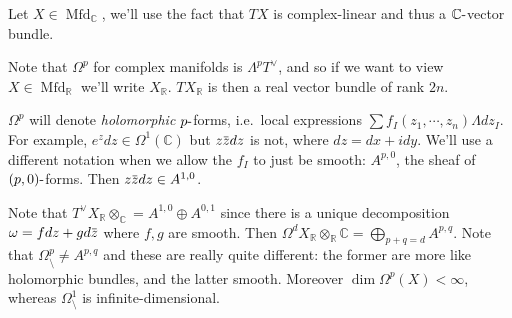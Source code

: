 Let \(X \in {\operatorname{Mfd}}_{\mathbb{C}}\), we'll use the fact that
\(TX\) is complex-linear and thus a \({\mathbb{C}}{\hbox{-}}\)vector
bundle.

\begin{figure}
\centering
{}
\end{figure}

\begin{remark}[Subtlety 1]

Note that \(\Omega^p\) for complex manifolds is \(\Lambda^p T^\vee\),
and so if we want to view \(X \in {\operatorname{Mfd}}_{\mathbb{R}}\)
we'll write \(X_{{\mathbb{R}}}\). \(TX_{\mathbb{R}}\) is then a real
vector bundle of rank \(2n\).

\end{remark}

\begin{remark}[Subtlety 2]

\(\Omega^p\) will denote \emph{holomorphic} \(p{\hbox{-}}\)forms,
i.e.~local expressions \(\sum f_I(z_1, \cdots, z_n) \Lambda dz_I\). For
example, \(e^zdz\in \Omega^1({\mathbb{C}})\) but
\(z\mkern 1.5mu\overline{\mkern-1.5muz\mkern-1.5mu}\mkern 1.5mu dz\) is
not, where \(dz = dx + idy\). We'll use a different notation when we
allow the \(f_I\) to just be smooth: \(A^{p, 0}\), the sheaf of
\((p, 0){\hbox{-}}\)forms. Then
\(z\mkern 1.5mu\overline{\mkern-1.5muz\mkern-1.5mu}\mkern 1.5mu dz\in A^{1, 0}\).

\end{remark}

\begin{remark}

Note that
\(T^\vee X_{\mathbb{R}}\otimes _{\mathbb{C}}= A^{1, 0} \oplus A^{0, 1}\)
since there is a unique decomposition
\(\omega = fdz + gd\mkern 1.5mu\overline{\mkern-1.5muz\mkern-1.5mu}\mkern 1.5mu\)
where \(f,g\) are smooth. Then
\(\Omega^d X_{\mathbb{R}}\otimes_{\mathbb{R}}{\mathbb{C}}= \bigoplus _{p+q=d} A^{p, q}\).
Note that \(\Omega_{\setminus}^p \neq A^{p, q}\) and these are really
quite different: the former are more like holomorphic bundles, and the
latter smooth. Moreover \(\dim \Omega^p(X) < \infty\), whereas
\(\Omega_{\setminus}^1\) is infinite-dimensional.

\end{remark}


